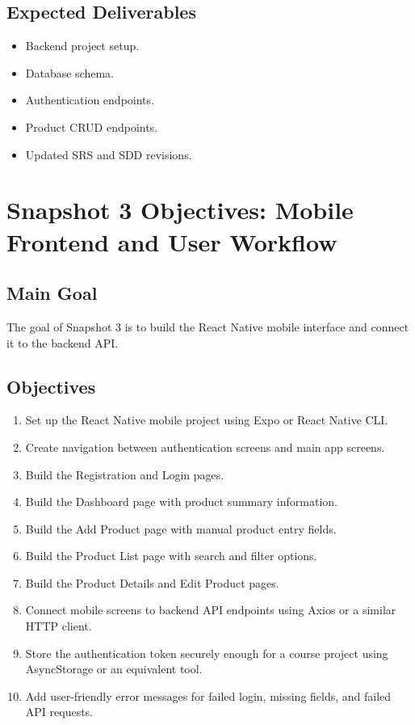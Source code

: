 \documentclass[12pt]{article}
\begin{document}
\subsection{Expected Deliverables}
\begin{itemize}[leftmargin=*]
    \item Backend project setup.
    \item Database schema.
    \item Authentication endpoints.
    \item Product CRUD endpoints.
    \item Updated SRS and SDD revisions.
\end{itemize}

\section{Snapshot 3 Objectives: Mobile Frontend and User Workflow}

\subsection{Main Goal}
The goal of Snapshot 3 is to build the React Native mobile interface and connect it to the backend API.

\subsection{Objectives}
\begin{enumerate}[leftmargin=*]
    \item Set up the React Native mobile project using Expo or React Native CLI.
    \item Create navigation between authentication screens and main app screens.
    \item Build the Registration and Login pages.
    \item Build the Dashboard page with product summary information.
    \item Build the Add Product page with manual product entry fields.
    \item Build the Product List page with search and filter options.
    \item Build the Product Details and Edit Product pages.
    \item Connect mobile screens to backend API endpoints using Axios or a similar HTTP client.
    \item Store the authentication token securely enough for a course project using AsyncStorage or an equivalent tool.
    \item Add user-friendly error messages for failed login, missing fields, and failed API requests.
\end{enumerate}
\end{document}
